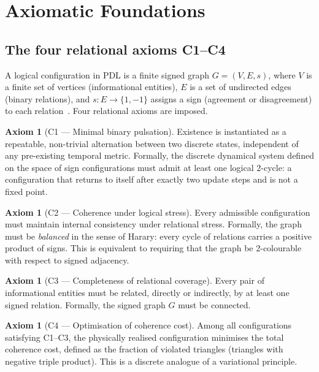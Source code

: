 \documentclass[11pt,a4paper]{article}
\theoremstyle{plain}
\theoremstyle{definition}
\newtheorem{axiom}[theorem]{Axiom}
\theoremstyle{remark}
\begin{document}
\section{Axiomatic Foundations}
\label{sec:axioms}

\subsection{The four relational axioms C1--C4}
\label{subsec:axioms}
A logical configuration in PDL is a finite signed graph $G=(V,E,s)$, where $V$ is a finite set of vertices (informational entities), $E$ is a set of undirected edges (binary relations), and $s\colon E\to\{1,-1\}$ assigns a sign (agreement or disagreement) to each relation~\cite{D01,D02}. Four relational axioms are imposed.

\begin{axiom}[C1 --- Minimal binary pulsation]
Existence is instantiated as a repeatable, non-trivial alternation between two discrete states, independent of any pre-existing temporal metric. Formally, the discrete dynamical system defined on the space of sign configurations must admit at least one logical $2$-cycle: a configuration that returns to itself after exactly two update steps and is not a fixed point.
\end{axiom}

\begin{axiom}[C2 --- Coherence under logical stress]
Every admissible configuration must maintain internal consistency under relational stress. Formally, the graph must be \emph{balanced} in the sense of Harary: every cycle of relations carries a positive product of signs. This is equivalent to requiring that the graph be 2-colourable with respect to signed adjacency.
\end{axiom}

\begin{axiom}[C3 --- Completeness of relational coverage]
Every pair of informational entities must be related, directly or indirectly, by at least one signed relation. Formally, the signed graph $G$ must be connected.
\end{axiom}

\begin{axiom}[C4 --- Optimisation of coherence cost]
Among all configurations satisfying C1--C3, the physically realised configuration minimises the total coherence cost, defined as the fraction of violated triangles (triangles with negative triple product). This is a discrete analogue of a variational principle.
\end{axiom}
\end{document}
